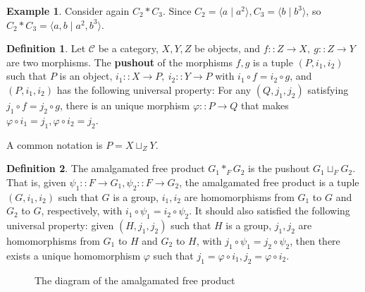\documentclass[a4paper]{article}
\theoremstyle{remark}
\theoremstyle{definition}
\newtheorem{example}{Example}
\theoremstyle{definition}
\newtheorem{definition}{Definition}
\theoremstyle{plain}
\begin{document}
  \begin{example}
    Consider again $C_2 \ast C_3$. Since $C_2 = \langle a \mid a^2 \rangle, C_3 = \langle b \mid b^3 \rangle$,
    so $C_2 \ast C_3 = \langle a, b \mid a^2, b^3 \rangle$.
  \end{example}

  \begin{definition}
    Let $\mathcal{C}$ be a category, $X, Y, Z$ be objects, and $f :: Z \to X,\ g :: Z \to Y$ are
    two morphisms. The {\bf pushout} of the morphisms $f, g$ is a tuple $(P, i_1, i_2)$ such
    that $P$ is an object, $i_1 :: X \to P,\ i_2 :: Y \to P$ with $i_1 \circ f = i_2 \circ g$,
    and $(P, i_1, i_2)$ has the following universal property: 
    For any $(Q, j_1, j_2)$ satisfying $j_1 \circ f = j_2 \circ g$, there is an unique morphism 
    $\varphi :: P \to Q$ that makes $\varphi \circ i_1 = j_1, \varphi \circ i_2 = j_2$.
    
    A common notation is $P = X \sqcup_{Z} Y$.
  \end{definition}

  \begin{definition}
    The amalgamated free product $G_1 \ast_F G_2$ is the pushout $G_1 \sqcup_{F} G_2$. That
    is, given $\psi_1 :: F \to G_1, \psi_2 :: F \to G_2$, the amalgamated free product is a tuple
    $(G, i_1, i_2)$ such that $G$ is a group, $i_1, i_2$ are homomorphisms from $G_1$ to $G$ and
    $G_2$ to $G$, respectively, with $i_1 \circ \psi_1 = i_2 \circ \psi_2$. It should also satisfied
    the following universal property: given $(H, j_1, j_2)$ such that $H$ is a group,
    $j_1, j_2$ are homomorphisms from $G_1$ to $H$ and $G_2$ to
    $H$, with $j_1 \circ \psi_1 = j_2 \circ \psi_2$, then there exists a unique homomorphism
    $\varphi$ such that $j_1 = \varphi \circ i_1, j_2 = \varphi \circ i_2$.
  \end{definition}

  \begin{figure}[h]
    \centering
    \caption{The diagram of the amalgamated free product}
  \end{figure}
\end{document}
